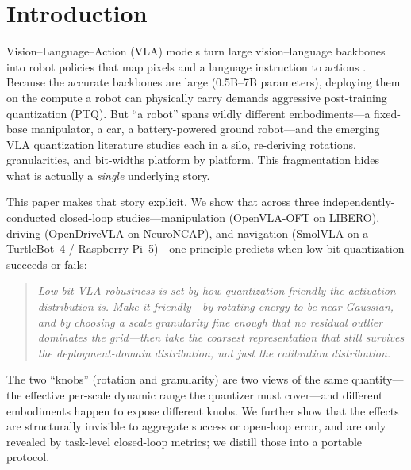 \documentclass[11pt]{article}
\begin{document}
\section{Introduction}
Vision--Language--Action (VLA) models turn large vision--language backbones into robot policies that
map pixels and a language instruction to actions \cite{openvla,openvlaoft}. Because the accurate
backbones are large (0.5B--7B parameters), deploying them on the compute a robot can physically carry
demands aggressive post-training quantization (PTQ). But ``a robot'' spans wildly different
embodiments---a fixed-base manipulator, a car, a battery-powered ground robot---and the emerging VLA
quantization literature studies each in a silo, re-deriving rotations, granularities, and bit-widths
platform by platform. This fragmentation hides what is actually a \emph{single} underlying story.

This paper makes that story explicit. We show that across three independently-conducted closed-loop
studies---manipulation (OpenVLA-OFT on LIBERO), driving (OpenDriveVLA on NeuroNCAP), and navigation
(SmolVLA on a TurtleBot~4 / Raspberry Pi~5)---one principle predicts when low-bit quantization
succeeds or fails:
\begin{quote}\itshape
Low-bit VLA robustness is set by how quantization-friendly the activation distribution is. Make it
friendly---by rotating energy to be near-Gaussian, and by choosing a scale granularity fine enough
that no residual outlier dominates the grid---then take the coarsest representation that still
survives the \emph{deployment}-domain distribution, not just the calibration distribution.
\end{quote}
The two ``knobs'' (rotation and granularity) are two views of the same quantity---the effective
per-scale dynamic range the quantizer must cover---and different embodiments happen to expose
different knobs. We further show that the effects are structurally invisible to aggregate success or
open-loop error, and are only revealed by task-level closed-loop metrics; we distill those into a
portable protocol.
\end{document}
